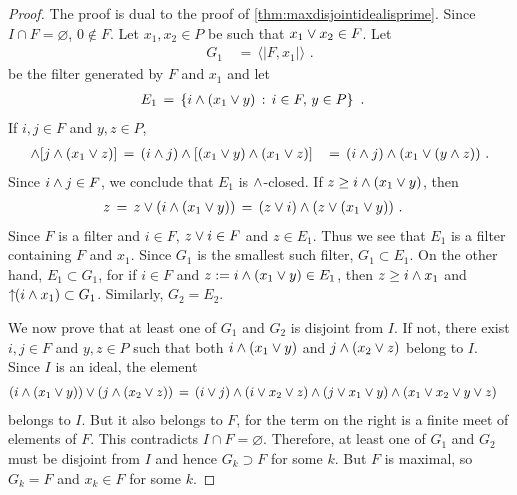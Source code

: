 \begin{proof}
	The proof is dual to the proof of \ref{thm:maxdisjointidealisprime}.
	Since $I\cap F=\varnothing$, $0\not\in F$. Let $x_{1},x_{2}\in P$
	be such that $x_{1}\vee x_{2}\in F$. Let
	\begin{align*}
		G_{1} & \,=\,\langle |F,x_{1}|\rangle
		\text{ .}
	\end{align*}
	be the filter generated by $F$ and $x_{1}$ and let
	\begin{align*}
		E_{1} & \,=\, \left\lbrace i\wedge(x_{1}\vee y)\,:\,
			i\in F,\,y\in P\right\rbrace
		\text{ .}
	\end{align*}
	If $i,j\in F$ and $y,z\in P$,
	\begin{align*}
		[i\boolprod (x_{1}\boolsum y)]\boolprod
			[j\boolprod (x_{1}\boolsum z)] & \,=\,
			(i\boolprod j)\boolprod [(x_{1}\boolsum y)\boolprod
						(x_{1}\boolsum z)]
			& \,=\,(i\boolprod j)\boolprod
				(x_{1}\boolsum (y\boolprod z))
		\text{ .}
	\end{align*}
	Since $i\wedge j\in F$, we conclude that $E_{1}$ is
	$\wedge$-closed. If $z\geq i\wedge (x_{1}\vee y)$, then
	\begin{align*}
		z & \,=\, z\vee (i\wedge (x_{1}\vee y))
			\,=\, (z\vee i)\wedge
				(z\vee (x_{1}\vee y))
		\text{ .}
	\end{align*}
	Since $F$ is a filter and $i\in F$, $z\vee i\in F$ and
	$z\in E_{1}$. Thus we see that $E_{1}$ is a filter containing
	$F$ and $x_{1}$. Since $G_{1}$ is the smallest such filter,
	$G_{1}\subset E_{1}$. On the other hand, $E_{1}\subset G_{1}$, for
	if $i\in F$ and $z:=i\wedge (x_{1}\vee y)\in E_{1}$, then
	$z\geq i\wedge x_{1}$ and $\uparrow\!\!(i\wedge x_{1})\subset G_{1}$.
	Similarly, $G_{2}=E_{2}$.

	We now prove that at least one of $G_{1}$ and $G_{2}$ is disjoint
	from $I$. If not, there exist $i,j\in F$ and $y,z\in P$ such that
	both $i\wedge(x_{1}\vee y)$ and $j\wedge (x_{2}\vee z)$
	belong to $I$. Since $I$ is an ideal, the element
	\begin{align*}
		(i\wedge (x_{1}\vee y))\vee
			(j\wedge (x_{2}\vee z)) & \,=\,
		(i\vee j)\wedge(i\vee x_{2}\vee z)\wedge
			(j\vee x_{1}\vee y)\wedge
			(x_{1}\vee x_{2}\vee y\vee z)
	\end{align*}
	belongs to $I$. But it also belongs to $F$, for the term on the
	right is a finite meet of elements of $F$. This contradicts
	$I\cap F=\varnothing$. Therefore, at least one of $G_{1}$ and $G_{2}$
	must be disjoint from $I$ and hence $G_{k}\supset F$ for some $k$.
	But $F$ is maximal, so $G_{k}=F$ and $x_{k}\in F$ for some $k$.
\end{proof}

